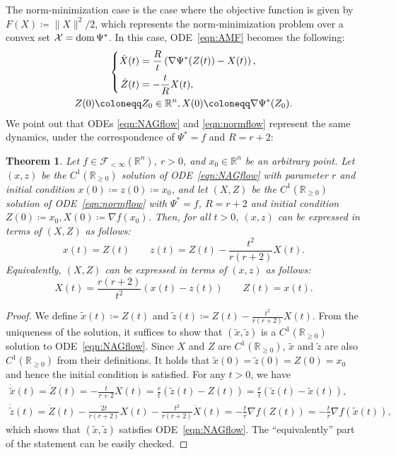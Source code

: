 \documentclass[11pt,a4paper]{article}
\theoremstyle{definition}
\theoremstyle{plain}
\newtheorem{thm}{Theorem}[section]
\newcommand{\RR}{{\mathbb{R}}}
\newcommand{\dom}{\mathop{\rm dom}}
\begin{document}
The norm-minimization case is the case where the objective function is given by $F(X) \coloneqq \|X\|^2/2$, which represents the norm-minimization problem over a convex set $\mathcal{X} = \dom\Psi^\ast$.
In this case, ODE~\eqref{eqn:AMF} becomes the following:
\begin{gather}
    \left\{
    \begin{aligned}
        \dot X(t) &= \frac{R}t\left(\nabla\Psi^\ast(Z(t)) - X(t)\right),\\
        \dot Z(t) &= -\frac{t}RX(t),
    \end{aligned}
    \right.\label{eqn:normflow}\\
    Z(0) \coloneqq Z_0 \in \RR^n, X(0) \coloneqq \nabla\Psi^\ast(Z_0).\notag
\end{gather}
We point out that ODEs \eqref{eqn:NAGflow} and \eqref{eqn:normflow} represent the same dynamics, under the correspondence of $\Psi^\ast = f$ and $R = r + 2$:
\begin{thm}
    \label{thm:correspondence}
    Let $f \in \mathcal{F}_{<\infty}(\RR^n)$, $r > 0$, and $x_0 \in \RR^n$ be an arbitrary point.
    Let $(x, z)$ be the $C^1(\RR_{\ge 0})$ solution of ODE~\eqref{eqn:NAGflow} with parameter $r$ and initial condition $x(0) \coloneqq z(0) \coloneqq x_0$, and let $(X, Z)$ be the $C^1(\RR_{\ge 0})$ solution of ODE~\eqref{eqn:normflow} with $\Psi^\ast = f$, $R = r + 2$ and initial condition $Z(0) \coloneqq x_0, X(0) \coloneqq \nabla f(x_0)$.
    Then, for all $t > 0$, $(x, z)$ can be expressed in terms of $(X, Z)$ as follows:
    \[
        x(t) = Z(t)\qquad
        z(t) = Z(t) - \frac{t^2}{r(r + 2)}X(t).
    \]
    Equivalently, $(X, Z)$ can be expressed in terms of $(x, z)$ as follows:
    \[
        X(t) = \frac{r(r + 2)}{t^2}\left(x(t) - z(t)\right)\qquad
        Z(t) = x(t).
    \]
\end{thm}
\begin{proof}
    We define $\tilde x(t) \coloneqq Z(t)$ and $\tilde z(t) \coloneqq Z(t) - \frac{t^2}{r(r + 2)}X(t)$.
    From the uniqueness of the solution, it suffices to show that $(\tilde x, \tilde z)$ is a $C^1(\RR_{\ge 0})$ solution to ODE~\eqref{eqn:NAGflow}.
    Since $X$ and $Z$ are $C^1(\RR_{\ge 0})$, $\tilde x$ and $\tilde z$ are also $C^1(\RR_{\ge 0})$ from their definitions.
    It holds that $\tilde x(0) = \tilde z(0) = Z(0) = x_0$ and hence the initial condition is satisfied.
    For any $t > 0$, we have
    \begin{gather*}
        \dot{\tilde x}(t) = \dot Z(t) = -\frac{t}{r + 2}X(t) = \frac{r}t(\tilde z(t) - Z(t)) = \frac{r}t(\tilde z(t) - \tilde x(t)),\\
        \dot{\tilde z}(t) = \dot Z(t) - \frac{2t}{r(r + 2)}X(t) - \frac{t^2}{r(r + 2)}\dot X(t) = -\frac{t}r\nabla f(Z(t)) = -\frac{t}r\nabla f(\tilde x(t)),
    \end{gather*}
    which shows that $(\tilde x, \tilde z)$ satisfies ODE~\eqref{eqn:NAGflow}.
    The ``equivalently'' part of the statement can be easily checked.
\end{proof}
\end{document}

